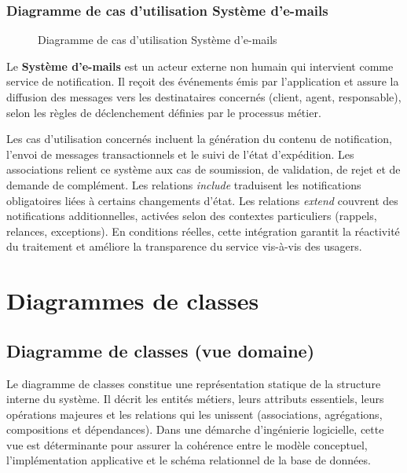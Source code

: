 \newpage
\subsubsection{Diagramme de cas d'utilisation Système d'e-mails}

\begin{figure}[H]
  \centering
  
  \caption{Diagramme de cas d'utilisation Système d'e-mails}
  \label{fig:dcu_systeme_emails}
\end{figure}

Le \textbf{Système d'e-mails} est un acteur externe non humain qui intervient comme service de notification. Il reçoit des événements émis par l'application et assure la diffusion des messages vers les destinataires concernés (client, agent, responsable), selon les règles de déclenchement définies par le processus métier.

Les cas d'utilisation concernés incluent la génération du contenu de notification, l'envoi de messages transactionnels et le suivi de l'état d'expédition. Les associations relient ce système aux cas de soumission, de validation, de rejet et de demande de complément. Les relations \emph{include} traduisent les notifications obligatoires liées à certains changements d'état. Les relations \emph{extend} couvrent des notifications additionnelles, activées selon des contextes particuliers (rappels, relances, exceptions). En conditions réelles, cette intégration garantit la réactivité du traitement et améliore la transparence du service vis-à-vis des usagers.

\newpage
\section{Diagrammes de classes}

\subsection{Diagramme de classes (vue domaine)}

Le diagramme de classes constitue une représentation statique de la structure interne du système. Il décrit les entités métiers, leurs attributs essentiels, leurs opérations majeures et les relations qui les unissent (associations, agrégations, compositions et dépendances). Dans une démarche d'ingénierie logicielle, cette vue est déterminante pour assurer la cohérence entre le modèle conceptuel, l'implémentation applicative et le schéma relationnel de la base de données.

